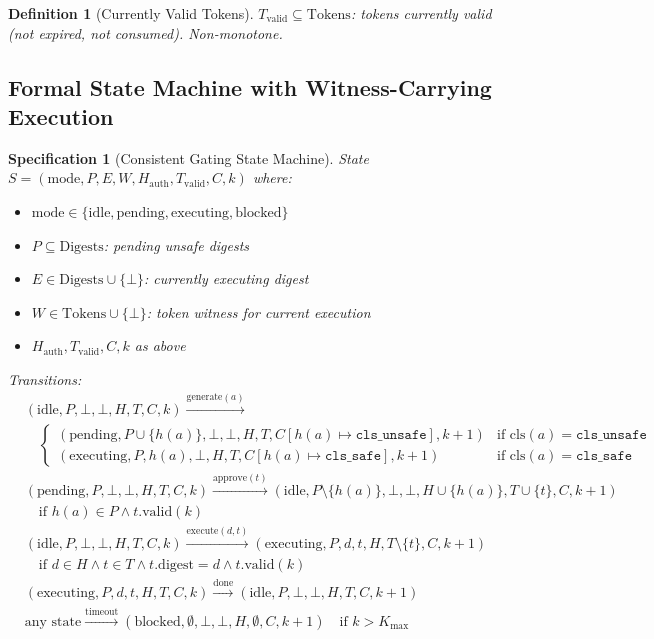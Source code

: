 \documentclass[12pt]{article}
\newtheorem{definition}{Definition}[section]
\newtheorem{spec}{Specification}[section]
\begin{document}
\begin{definition}[Currently Valid Tokens]
$T_{\text{valid}} \subseteq \mathrm{Tokens}$: tokens currently valid (not expired, not consumed). Non-monotone.
\end{definition}

\subsection{Formal State Machine with Witness-Carrying Execution}

\begin{spec}[Consistent Gating State Machine]
State $S = (\text{mode}, P, E, W, H_{\text{auth}}, T_{\text{valid}}, C, k)$ where:
\begin{itemize}
    \item $\text{mode} \in \{\text{idle}, \text{pending}, \text{executing}, \text{blocked}\}$
    \item $P \subseteq \mathrm{Digests}$: pending unsafe digests
    \item $E \in \mathrm{Digests} \cup \{\bot\}$: currently executing digest
    \item $W \in \mathrm{Tokens} \cup \{\bot\}$: token witness for current execution
    \item $H_{\text{auth}}, T_{\text{valid}}, C, k$ as above
\end{itemize}

Transitions:
\begin{align*}
& (\text{idle}, P, \bot, \bot, H, T, C, k) \xrightarrow{\text{generate}(a)} \\
& \quad \begin{cases}
(\text{pending}, P\cup\{h(a)\}, \bot, \bot, H, T, C[h(a)\mapsto\texttt{cls\_unsafe}], k+1) & \text{if } \mathrm{cls}(a)=\texttt{cls\_unsafe} \\
(\text{executing}, P, h(a), \bot, H, T, C[h(a)\mapsto\texttt{cls\_safe}], k+1) & \text{if } \mathrm{cls}(a)=\texttt{cls\_safe}
\end{cases} \\
& (\text{pending}, P, \bot, \bot, H, T, C, k) \xrightarrow{\text{approve}(t)} (\text{idle}, P\setminus\{h(a)\}, \bot, \bot, H\cup\{h(a)\}, T\cup\{t\}, C, k+1) \\
& \quad \text{if } h(a) \in P \land t.\mathrm{valid}(k) \\
& (\text{idle}, P, \bot, \bot, H, T, C, k) \xrightarrow{\text{execute}(d,t)} (\text{executing}, P, d, t, H, T\setminus\{t\}, C, k+1) \\
& \quad \text{if } d \in H \land t \in T \land t.\mathrm{digest}=d \land t.\mathrm{valid}(k) \\
& (\text{executing}, P, d, t, H, T, C, k) \xrightarrow{\text{done}} (\text{idle}, P, \bot, \bot, H, T, C, k+1) \\
& \text{any state} \xrightarrow{\text{timeout}} (\text{blocked}, \emptyset, \bot, \bot, H, \emptyset, C, k+1) \quad \text{if } k > K_{\max}
\end{align*}
\end{spec}
\end{document}
